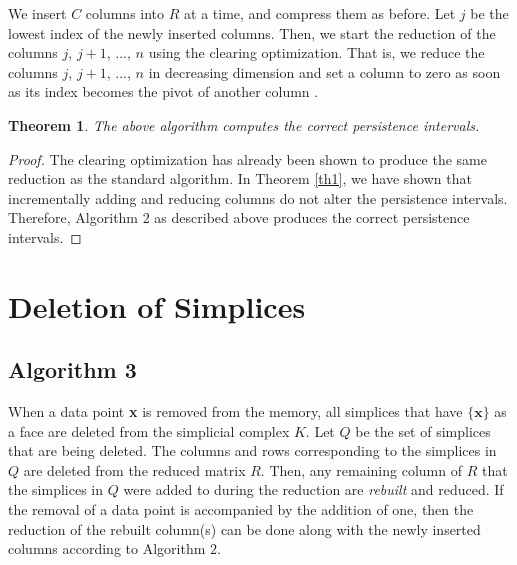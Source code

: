 \documentclass[11pt]{article}
\newtheorem{theorem}{Theorem}[section]
\begin{document}
We insert $C$ columns into $R$ at a time, and compress them as before.  Let $j$ be the lowest index 
of the newly inserted columns.  Then, we start the reduction of the columns $j$, $j + 1$, ..., $n$ 
using the clearing optimization.  That is, we reduce the columns $j$, $j + 1$, ..., $n$ in 
decreasing dimension and set a column to zero as soon as its index becomes the pivot of another 
column \cite{chen-11}.


\begin{theorem}
	The above algorithm computes the correct persistence intervals.
\end{theorem}


\begin{proof}
	
	The clearing optimization has already been shown to produce the same reduction as the standard
	algorithm.  In Theorem \ref{th1}, we have shown that incrementally adding and reducing columns  
	do not alter the persistence intervals.  Therefore, Algorithm $2$ as described above produces 
	the correct persistence intervals.
	
\end{proof}




\section{Deletion of Simplices}

\subsection{Algorithm 3}

When a data point \textbf{x} is removed from the memory, all simplices that have $\{\textbf{x}\}$ 
as a face are deleted from the simplicial complex $K$. Let $Q$ be the set of simplices that are 
being deleted.  The columns and rows corresponding to the simplices in $Q$ are deleted from the 
reduced matrix $R$.  Then, any remaining column of $R$ that the simplices in $Q$ were added to 
during the reduction are \emph{rebuilt} and reduced.  If the removal of a data point is accompanied 
by the addition of one, then the reduction of the rebuilt column(s) can be done along with the 
newly inserted columns according to Algorithm $2$.






\end{document}
